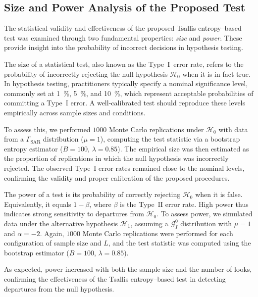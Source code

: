 \documentclass[
  lettersize  journal,
]{IEEEtran}%
\begin{document}
\subsection{Size and Power Analysis of the Proposed
Test}\label{size-and-power-analysis-of-the-proposed-test}

The statistical validity and effectiveness of the proposed Tsallis
entropy--based test was examined through two fundamental properties:
\emph{size} and \emph{power}. These provide insight into the probability
of incorrect decisions in hypothesis testing.

The size of a statistical test, also known as the Type~I~error rate,
refers to the probability of incorrectly rejecting the null hypothesis
\(\mathcal{H}_0\) when it is in fact true. In hypothesis testing,
practitioners typically specify a nominal significance level, commonly
set at \SI{1}{\percent}, \SI{5}{\percent}, and \SI{10}{\percent}, which
represent acceptable probabilities of committing a Type~I error. A
well-calibrated test should reproduce these levels empirically across
sample sizes and conditions.

To assess this, we performed \(1000\) Monte Carlo replications under
\(\mathcal{H}_0\) with data from a \(\Gamma_{\text{SAR}}\) distribution
(\(\mu=1\)), computing the test statistic via a bootstrap entropy
estimator (\(B=100\), \(\lambda=0.85\)). The empirical size was then
estimated as the proportion of replications in which the null hypothesis
was incorrectly rejected. The observed Type~I error rates remained close
to the nominal levels, confirming the validity and proper calibration of
the proposed procedures.

The power of a test is its probability of correctly rejecting
\(\mathcal{H}_0\) when it is false. Equivalently, it equals \(1-\beta\),
where \(\beta\) is the Type~II error rate. High power thus indicates
strong sensitivity to departures from \(\mathcal{H}_0\). To assess
power, we simulated data under the alternative hypothesis
\(\mathcal{H}_1\), assuming a \(\mathcal{G}^0_I\) distribution with
\(\mu=1\) and \(\alpha=-2\). Again, \(1000\) Monte Carlo replications
were performed for each configuration of sample size and \(L\), and the
test statistic was computed using the bootstrap estimator (\(B=100\),
\(\lambda=0.85\)).

As expected, power increased with both the sample size and the number of
looks, confirming the effectiveness of the Tsallis entropy--based test
in detecting departures from the null hypothesis.
\end{document}
